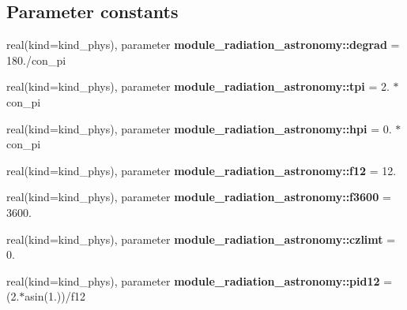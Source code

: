 \subsection*{Parameter constants}
\begin{DoxyCompactItemize}
\item 
\mbox{\label{group__module__radiation__astronomy_ga220d2b997b3073cf2985d62111c5405d}} 
real(kind=kind\+\_\+phys), parameter {\bfseries module\+\_\+radiation\+\_\+astronomy\+::degrad} = 180./con\+\_\+pi
\item 
\mbox{\label{group__module__radiation__astronomy_ga4fbf4be04e17f1f8d0674ee2e20506b0}} 
real(kind=kind\+\_\+phys), parameter {\bfseries module\+\_\+radiation\+\_\+astronomy\+::tpi} = 2. $\ast$ con\+\_\+pi
\item 
\mbox{\label{group__module__radiation__astronomy_ga7369d8561566f5e7e51ccc40e09f2520}} 
real(kind=kind\+\_\+phys), parameter {\bfseries module\+\_\+radiation\+\_\+astronomy\+::hpi} = 0. $\ast$ con\+\_\+pi
\item 
\mbox{\label{group__module__radiation__astronomy_gad59856e8f877eb05a6b22610f14a391d}} 
real(kind=kind\+\_\+phys), parameter {\bfseries module\+\_\+radiation\+\_\+astronomy\+::f12} = 12.
\item 
\mbox{\label{group__module__radiation__astronomy_ga37b491dde50d06e339effb4a31d9f245}} 
real(kind=kind\+\_\+phys), parameter {\bfseries module\+\_\+radiation\+\_\+astronomy\+::f3600} = 3600.
\item 
\mbox{\label{group__module__radiation__astronomy_gafeb2fccbe8137de6099a09035762ff5e}} 
real(kind=kind\+\_\+phys), parameter {\bfseries module\+\_\+radiation\+\_\+astronomy\+::czlimt} = 0.
\item 
\mbox{\label{group__module__radiation__astronomy_gadbf9cdfc7b55d882f015a4bc4ef276ab}} 
real(kind=kind\+\_\+phys), parameter {\bfseries module\+\_\+radiation\+\_\+astronomy\+::pid12} = (2.$\ast$asin(1.))/f12
\end{DoxyCompactItemize}
